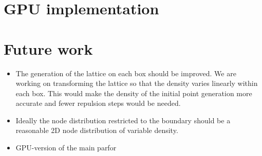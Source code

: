 \documentclass[10pt]{amsart}
\begin{document}
\section{GPU implementation}



\section{Future work}

\begin{itemize}
\item The generation of the lattice on each box should be improved. We are working on transforming the lattice so that the density varies linearly within each box. This would make the density of the initial point generation more accurate and fewer repulsion steps would be needed.
\item Ideally the node distribution restricted to the boundary should be a reasonable 2D node distribution of variable density.
\item GPU-version of the main parfor \cite{Recipes1989}
\end{itemize}



\end{document}
